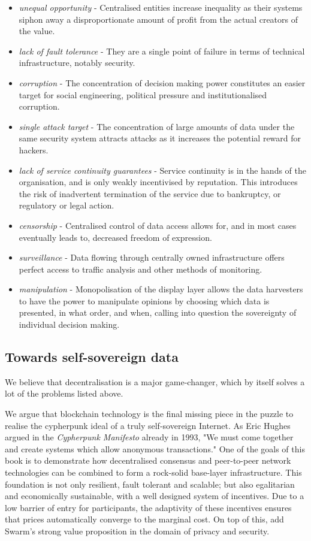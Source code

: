 \begin{itemize}[noitemsep]
    \item \emph{unequal opportunity} - Centralised entities increase inequality as their systems siphon away a disproportionate amount of profit from the actual creators of the value.
    \item \emph{lack of fault tolerance} - They are a single point of failure in terms of technical infrastructure, notably security.
    \item \emph{corruption} - The concentration of decision making power constitutes an easier target for social engineering, political pressure and institutionalised corruption.
    \item \emph{single attack target} - The concentration of large amounts of data under the same security system attracts attacks as it increases the potential reward for hackers. 
    \item \emph{lack of service continuity guarantees} - Service continuity is in the hands of the organisation, and is only weakly incentivised by reputation. This introduces the risk of inadvertent termination of the service due to bankruptcy, or regulatory or legal action.
    \item \emph{censorship} - Centralised control of data access allows for, and in most cases eventually leads to, decreased freedom of expression.
    \item \emph{surveillance} - Data flowing through centrally owned infrastructure offers perfect access to traffic analysis and other methods of monitoring.
    \item \emph{manipulation} - Monopolisation of the display layer allows the data harvesters to have the power to manipulate opinions by choosing which data is presented, in what order, and when, calling into question the sovereignty of individual decision making.
\end{itemize}


\subsection{Towards self-sovereign data \statusgreen} \label{sec:selfsovereigndata}

We believe that decentralisation is a major game-changer, which by itself solves a lot of the problems listed above.

We argue that blockchain technology is the final missing piece in the puzzle to realise the cypherpunk ideal of a truly self-sovereign Internet. As Eric Hughes argued in the \emph{Cypherpunk Manifesto} \cite{hughes1993} already in 1993, "We must come together and create systems which allow anonymous transactions." One of the goals of this book is to demonstrate how decentralised consensus and peer-to-peer network technologies can be combined to form a rock-solid base-layer infrastructure. This foundation is not only resilient, fault tolerant and scalable; but also egalitarian and economically sustainable, with a well designed system of incentives. Due to a low barrier of entry for participants, the adaptivity of these incentives ensures that prices automatically converge to the marginal cost. On top of this, add Swarm's strong value proposition in the domain of privacy and security.

